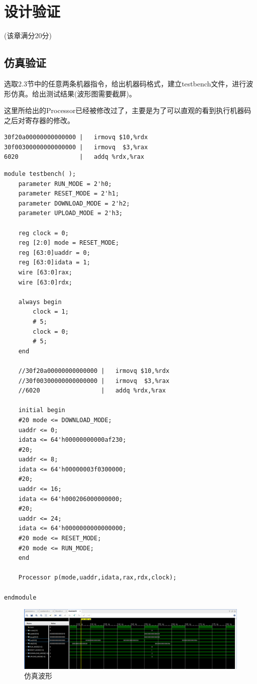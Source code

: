 \section{设计验证}
\begin{center}
    (该章满分20分)
\end{center}

\subsection{仿真验证}

选取2.3节中的任意两条机器指令，给出机器码格式，建立testbench文件，进行波形仿真。给出测试结果(波形图需要截屏)。

这里所给出的Processor已经被修改过了，主要是为了可以直观的看到执行机器码之后对寄存器的修改。

\begin{verbatim}
30f20a00000000000000 |   irmovq $10,%rdx
30f00300000000000000 |   irmovq  $3,%rax
6020                 |   addq %rdx,%rax
\end{verbatim}

\begin{verbatim}
module testbench( );
    parameter RUN_MODE = 2'h0;
    parameter RESET_MODE = 2'h1;
    parameter DOWNLOAD_MODE = 2'h2;
    parameter UPLOAD_MODE = 2'h3;
    
    reg clock = 0;
    reg [2:0] mode = RESET_MODE;
    reg [63:0]uaddr = 0;
    reg [63:0]idata = 1;
    wire [63:0]rax;
    wire [63:0]rdx;
    
    always begin
        clock = 1;
        # 5;
        clock = 0;
        # 5;
    end
    
    //30f20a00000000000000 |   irmovq $10,%rdx
    //30f00300000000000000 |   irmovq  $3,%rax
    //6020                 |   addq %rdx,%rax
    
    initial begin
    #20 mode <= DOWNLOAD_MODE;
    uaddr <= 0;
    idata <= 64'h00000000000af230;
    #20;
    uaddr <= 8;
    idata <= 64'h00000003f0300000;
    #20;
    uaddr <= 16;
    idata <= 64'h000206000000000;
    #20;
    uaddr <= 24;
    idata <= 64'h0000000000000000;
    #20 mode <= RESET_MODE;
    #20 mode <= RUN_MODE;
    end
    
    Processor p(mode,uaddr,idata,rax,rdx,clock);

endmodule
\end{verbatim}

\begin{figure}
    \centering
    \includegraphics[width=0.7\linewidth]{figures/Sim}
    \caption{仿真波形}
    \label{fig:sim}
\end{figure}


